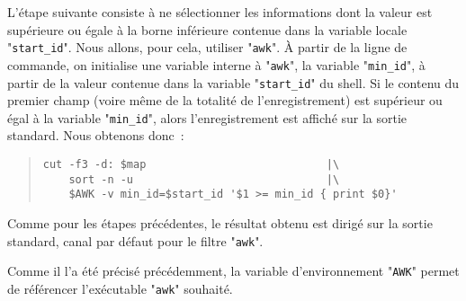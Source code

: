 L'{\'e}tape suivante consiste {\`a} ne s{\'e}lectionner les informations dont la
valeur est sup{\'e}rieure ou {\'e}gale {\`a} la borne inf{\'e}rieure contenue dans la
variable locale "{\tt start\_id}". Nous allons, pour cela, utiliser
"{\tt awk}". {\`A} partir de la ligne de commande, on initialise une
variable interne {\`a} "{\tt awk}", la variable "{\tt min\_id}", {\`a}
partir de la valeur contenue dans la variable "{\tt start\_id}" du
shell. Si le contenu du premier champ (voire m{\^e}me de la totalit{\'e} de
l'enregistrement) est sup{\'e}rieur ou {\'e}gal {\`a} la variable "{\tt min\_id}",
alors l'enregistrement est affich{\'e} sur la sortie standard. Nous obtenons
donc~:
\begin{quote}
\begin{verbatim}
cut -f3 -d: $map                            |\
    sort -n -u                              |\
    $AWK -v min_id=$start_id '$1 >= min_id { print $0}'
\end{verbatim}
\end{quote}
Comme pour les {\'e}tapes pr{\'e}c{\'e}dentes, le r{\'e}sultat obtenu est dirig{\'e} sur la sortie
standard, canal par d{\'e}faut pour le filtre "{\tt awk}".

\begin{remarque}
Comme il l'a {\'e}t{\'e} pr{\'e}cis{\'e} pr{\'e}c{\'e}demment, la variable d'environnement
"{\tt AWK}" permet de r{\'e}f{\'e}rencer l'ex{\'e}cutable "{\tt awk}" souhait{\'e}.
\end{remarque}


